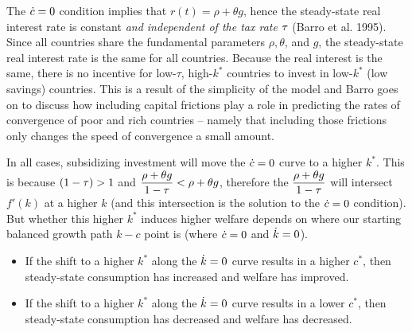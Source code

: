 \documentclass[12pt]{article}
\begin{document}
\newpage{}

The $\dot c=0$ condition implies that $r(t) = \rho + \theta g$, hence the steady-state real interest rate is constant \textit{and independent of the tax rate} $\tau$ (Barro et al. 1995). Since all countries share the fundamental parameters $\rho, \theta$, and $g$, the steady-state real interest rate is the same for all countries. Because the real interest is the same, there is no incentive for low-$\tau$, high-$k^*$ countries to invest in low-$k^*$ (low savings) countries. This is a result of the simplicity of the model and Barro goes on to discuss how including capital frictions play a role in predicting the rates of convergence of poor and rich countries -- namely that including those frictions only changes the speed of convergence a small amount.
 

\newpage{}

In all cases, subsidizing investment will move the $\dot c=0$ curve to a higher $k^*$. This is because $(1-\tau)>1$ and $\dfrac{\rho+\theta g}{1-\tau}<\rho+\theta g$, therefore the $\dfrac{\rho+\theta g}{1-\tau}$ will intersect $f'(k)$ at a higher $k$ (and this intersection is the solution to the $\dot c=0$ condition). But whether this higher $k^*$ induces higher welfare depends on where our starting balanced growth path $k-c$ point is (where $\dot c=0$ and $\dot k=0$). 

\begin{itemize}
    \item If the shift to a higher $k^*$ along the $\dot k=0$ curve results in a higher $c^*$, then steady-state consumption has increased and welfare has improved.
    \item If the shift to a higher $k^*$ along the $\dot k=0$ curve results in a lower $c^*$, then steady-state consumption has decreased and welfare has decreased.
\end{itemize}
\end{document}
